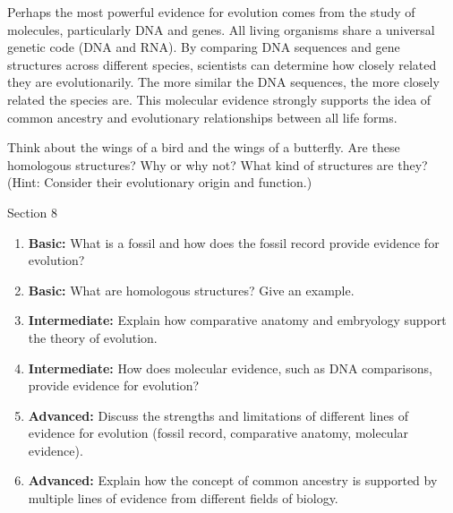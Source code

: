 Perhaps the most powerful evidence for evolution comes from the study of molecules, particularly DNA and genes.  All living organisms share a universal genetic code (DNA and RNA).  By comparing DNA sequences and gene structures across different species, scientists can determine how closely related they are evolutionarily.  The more similar the DNA sequences, the more closely related the species are.  This molecular evidence strongly supports the idea of common ancestry and evolutionary relationships between all life forms.

\begin{marginnote}
\end{marginnote}


\begin{stopandthink}
Think about the wings of a bird and the wings of a butterfly. Are these homologous structures? Why or why not? What kind of structures are they? (Hint: Consider their evolutionary origin and function.)
\end{stopandthink}


\begin{tieredquestions}{Section 8}

\begin{enumerate}
    \item \textbf{Basic:} What is a fossil and how does the fossil record provide evidence for evolution?
    \item \textbf{Basic:} What are homologous structures? Give an example.
    \item \textbf{Intermediate:} Explain how comparative anatomy and embryology support the theory of evolution.
    \item \textbf{Intermediate:} How does molecular evidence, such as DNA comparisons, provide evidence for evolution?
    \item \textbf{Advanced:} Discuss the strengths and limitations of different lines of evidence for evolution (fossil record, comparative anatomy, molecular evidence).
    \item \textbf{Advanced:}  Explain how the concept of common ancestry is supported by multiple lines of evidence from different fields of biology.
\end{enumerate}

\end{tieredquestions}



